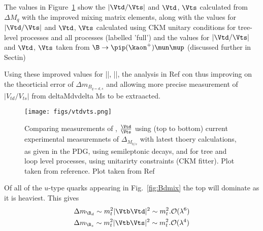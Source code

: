 The values in Figure~\ref{Fig:vtdvts} show the $|\Vtd/\Vts|$ and $\Vtd$, $\Vts$ calculated from $\Delta M_{q}$ with the improved mixing matrix elements, along with the values for $|\Vtd/\Vts|$ and $\Vtd$, $\Vts$ calculated using CKM unitary conditions for tree-level processes and all processes (labelled 'full') and the values for $|\Vtd/\Vts|$ and $\Vtd$, $\Vts$ taken from $\B\to\pip(\kaon^{+})\mun\mup$ (discussed further in Sectin)   %

Using these improved values for |\Vtd|, |\Vts|, the analysis in Ref con
thus improving on the
theorticial error of $\Delta m_{B_{q = d,s}}$ and allowing more precise measurement of $|V_{td}/V_{ts}|$ from deltaMdvdelta Ms to be extraacted.

\begin{figure}
\texttt{[image: figs/vtdvts.png]}
\caption{Comparing measurements of \Vtd, \Vts $\frac{\Vtd}{\Vts}$ using (top to bottom) current experimental measuremnets of $\Delta_{M_{b/s}}$ with latest thoery calculations, as given in the PDG,  using semileptonic decays, and for tree and loop level processes, using unitarirty constraints (CKM fitter). Plot taken from reference. Plot taken from Ref~\cite{vtdvts}}
\label{Fig:vtdvts}
\end{figure}


Of all of the $u$-type quarks appearing in Fig.~\ref{fig:Bdmix} the top will dominate as it is heaviest. This gives
\begin{equation}
  \begin{split}
    & \Delta m_{\B_{d}} \sim m_{t}^{2}|\Vtb\Vtd|^{2} \sim m_{t}^{2}.\mathcal{O}(\lambda^{6}) \\
    & \Delta m_{\B_{s}} \sim m_{t}^{2}|\Vtb\Vts|^{2} \sim m_{t}^{2}.\mathcal{O}(\lambda^{4})
  \end{split}
\end{equation}
 
